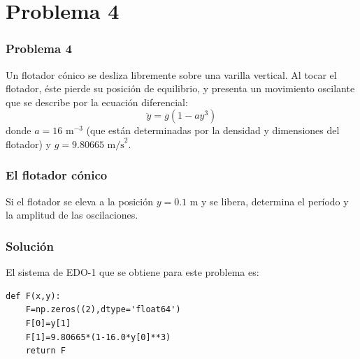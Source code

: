 \section{Problema 4}
\begin{frame}
\frametitle{Problema 4}
Un flotador cónico se desliza libremente sobre una varilla vertical. Al tocar el flotador, éste pierde su posición de equilibrio, y presenta un movimiento oscilante que se describe por la ecuación diferencial:
\[ \ddot{y} = g (1 - a y^{3}) \]
donde $a=16 \mbox{ m}^{-3}$ (que están determinadas por la densidad y dimensiones del flotador) y $g=9.80665 \mbox{ m/s}^{2}$. 
\end{frame}
\begin{frame}[fragile]
\frametitle{El flotador cónico}
\begin{center}
\end{center}
Si el flotador se eleva a la posición $y=0.1$ m y se libera, determina el período y la amplitud de las oscilaciones.
\end{frame}
\begin{frame}[fragile]
\frametitle{Solución}
El sistema de EDO-1 que se obtiene para este problema es:
\begin{lstlisting}
def F(x,y):
    F=np.zeros((2),dtype='float64')
    F[0]=y[1]
    F[1]=9.80665*(1-16.0*y[0]**3)
    return F
\end{lstlisting}
\end{frame}
